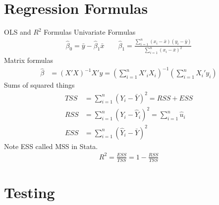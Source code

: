 \documentclass[aspectratio=169, handout]{beamer}
\newcommand{\sumin}{\sum^n_{i=1}}
\begin{document}
\section{Regression Formulas}

{\scriptsize
\begin{frame}{OLS and $R^2$ Formulas}
Univariate Formulas
\begin{align*}
  \hat{\beta}_0=\bar{y}-\hat{\beta}_1\bar{x}
  \qquad
  \hat{\beta}_1=\frac{\sumin (x_i-\bar{x})(y_i-\bar{y})}{\sumin  (x_i-\bar{x})^2}
\end{align*}
Matrix formulas
\begin{align*}
  \hat{\beta}
  &= (X'X)^{-1}X'y
  =
  \left(\sumin X'_iX_i\right)^{-1}
  \left(\sumin X_i'y_i\right)
\end{align*}
Sums of squared things
\begin{align*}
  TSS &= \sumin (Y_i-\bar{Y})^2
  =
  RSS + ESS
  \\
  RSS &= \sumin (Y_i-\hat{Y}_i)^2 = \sumin \hat{u}_i\\
  ESS &= \sumin (\hat{Y}_i-\bar{Y})^2
\end{align*}
Note ESS called MSS in Stata.
\begin{align*}
  R^2
  = \frac{ESS}{TSS}
  = 1-\frac{RSS}{TSS}
\end{align*}
\end{frame}
}



\section{Testing}
\end{document}
